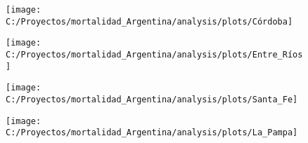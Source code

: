 \documentclass[10pt,ignorenonframetext,]{beamer}
\begin{document}
\begin{frame}

\begin{figure}

{\centering \texttt{[image: C:/Proyectos/mortalidad\_Argentina/analysis/plots/Córdoba]} 

}

\end{figure}

\end{frame}

\begin{frame}

\begin{figure}

{\centering \texttt{[image: C:/Proyectos/mortalidad\_Argentina/analysis/plots/Entre\_Ríos]} 

}

\end{figure}

\end{frame}

\begin{frame}

\begin{figure}

{\centering \texttt{[image: C:/Proyectos/mortalidad\_Argentina/analysis/plots/Santa\_Fe]} 

}

\end{figure}

\end{frame}

\begin{frame}

\begin{figure}

{\centering \texttt{[image: C:/Proyectos/mortalidad\_Argentina/analysis/plots/La\_Pampa]} 

}

\end{figure}

\end{frame}
\end{document}
